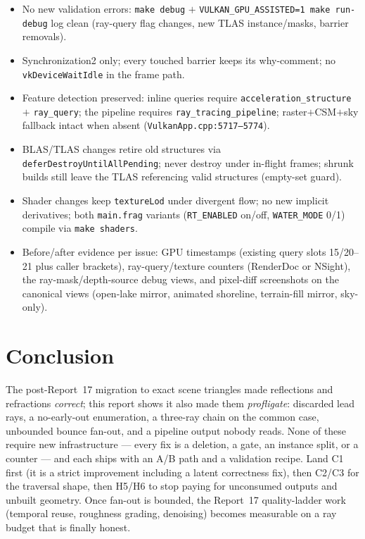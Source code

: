 \documentclass[11pt,a4paper]{article}
\begin{document}
\begin{itemize}
    \item No new validation errors: \texttt{make debug} $+$ \texttt{VULKAN\_GPU\_ASSISTED=1 make run-debug} log clean (ray-query flag changes, new TLAS instance/masks, barrier removals).
    \item Synchronization2 only; every touched barrier keeps its why-comment; no \texttt{vkDeviceWaitIdle} in the frame path.
    \item Feature detection preserved: inline queries require \texttt{acceleration\_structure} $+$ \texttt{ray\_query}; the pipeline requires \texttt{ray\_tracing\_pipeline}; raster$+$CSM$+$sky fallback intact when absent (\texttt{VulkanApp.cpp:5717--5774}).
    \item BLAS/TLAS changes retire old structures via \texttt{deferDestroyUntilAllPending}; never destroy under in-flight frames; shrunk builds still leave the TLAS referencing valid structures (empty-set guard).
    \item Shader changes keep \texttt{textureLod} under divergent flow; no new implicit derivatives; both \texttt{main.frag} variants (\texttt{RT\_ENABLED} on/off, \texttt{WATER\_MODE} 0/1) compile via \texttt{make shaders}.
    \item Before/after evidence per issue: GPU timestamps (existing query slots 15/20--21 plus caller brackets), ray-query/texture counters (RenderDoc or NSight), the ray-mask/depth-source debug views, and pixel-diff screenshots on the canonical views (open-lake mirror, animated shoreline, terrain-fill mirror, sky-only).
\end{itemize}

\section{Conclusion}

The post-Report~17 migration to exact scene triangles made reflections and refractions \emph{correct}; this report shows it also made them \emph{profligate}: discarded lead rays, a no-early-out enumeration, a three-ray chain on the common case, unbounded bounce fan-out, and a pipeline output nobody reads. None of these require new infrastructure --- every fix is a deletion, a gate, an instance split, or a counter --- and each ships with an A/B path and a validation recipe. Land C1 first (it is a strict improvement including a latent correctness fix), then C2/C3 for the traversal shape, then H5/H6 to stop paying for unconsumed outputs and unbuilt geometry. Once fan-out is bounded, the Report~17 quality-ladder work (temporal reuse, roughness grading, denoising) becomes measurable on a ray budget that is finally honest.
\end{document}
